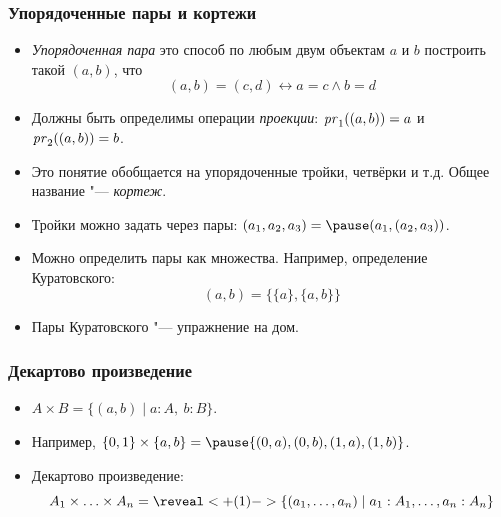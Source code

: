 \documentclass[10pt]{beamer}
\begin{document}
\begin{frame}
    \frametitle{Упорядоченные пары и кортежи}
    \begin{itemize}
        \item \emph{Упорядоченная пара} это способ по любым двум объектам $a$ и $b$ построить такой $(a,b)$, что \pause
        $$(a,b) = (c,d) \leftrightarrow a = c \land b = d$$
        \item Должны быть определимы операции \emph{проекции}: $\mathit{pr}_1((a,b))=a$ и $\mathit{pr}_2((a,b))=b$.
        \item Это понятие обобщается на упорядоченные тройки, четвёрки и т.д. Общее название "--- \emph{кортеж}.
        \item Тройки можно задать через пары: $(a_1, a_2, a_3) = \pause (a_1, (a_2, a_3))$.
        \item Можно определить пары как множества. Например, определение Куратовского: $$(a, b) = \{\{a\}, \{a, b\}\}$$
        \item Пары Куратовского "--- упражнение на дом.
    \end{itemize}
\end{frame}

\begin{frame}
    \frametitle{Декартово произведение}
    \begin{itemize}
        \item $A\times B=\{(a,b)\mid a:A,~b:B\}$.
        \item Например, $\{0,1\}\times\{a,b\}=\pause\{(0,a),(0,b),(1,a),(1,b)\}$.
        \pause
        \item Декартово произведение: $$A_1 \times \ldots \times A_n = \reveal<+(1)->{\{(a_1, \ldots, a_n) \mid a_1 : A_1, \ldots, a_n : A_n\}}$$
    \end{itemize}
\end{frame}
\end{document}
